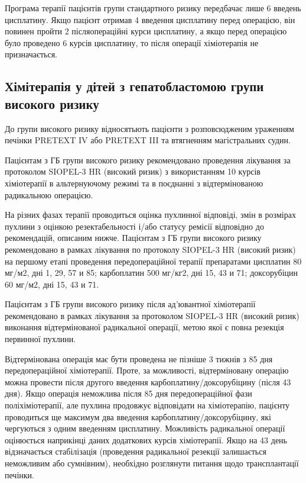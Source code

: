Програма терапії пацієнтів групи стандартного ризику передбачає лише 6 введень цисплатину. Якщо пацієнт отримав 4 введення цисплатину перед операцією, він повинен пройти 2 післяопераційні курси цисплатину, а якщо перед операцією було проведено 6 курсів цисплатину, то після операції хіміотерапія не призначається\cite{pmid32843604}.

\subsection{Хімітерапія у дітей з гепатобластомою групи високого ризику}
До групи високого ризику відносятьють пацієнти з розповсюдженим ураженням печінки PRETEXT IV або PRETEXT III та втягненням магістральних судин.

Пацієнтам з ГБ групи високого ризику рекомендовано проведення лікування за протоколом SIOPEL-3 HR (високий ризик) з використанням 10 курсів хіміотерапії в альтернуючому режимі та в поєднанні з відтермінованою радикальною операцією\cite{pmid28921939}.

На різних фазах терапії проводиться оцінка пухлинної відповіді, змін в розмірах пухлини з оцінкою резектабельності і/або статусу ремісії відповідно до рекомендацій, описаним нижче. 
Пацієнтам з ГБ групи високого ризику рекомендовано в рамках лікування по протоколу SIOPEL-3 HR (високий ризик) на першому етапі проведення передопераційної терапії препаратами цисплатин 80 мг/м2, дні 1, 29, 57 и 85; карбоплатин 500 мг/кг2, дні 15, 43 и 71; доксорубіцин 60 мг/м2, дні 15, 43 и 71.

Пацієнтам з ГБ групи високого ризику після ад'ювантної хіміотерапії рекомендовано в рамках лікування за протоколом SIOPEL-3 HR (високий ризик) виконання відтермінованої радикальної операції, метою якої є повна резекція первинної пухлини\cite{pmid11819207}.

Відтермінована операція має бути проведена не пізніше 3 тижнів з 85 дня передопераційної хіміотерапії. Проте, за можливості, відтерміновану операцію можна провести після другого введення карбоплатину/доксорубіцину (після 43 дня). Якщо операція неможлива після 85 дня передопераційної фази поліхіміотерапії, але пухлина продовжує відповідати на хіміотерапію, пацієнту проводиться ще максимум два введення карбоплатину/доксорубіцину, які чергуються з одним введенням цисплатину. Можливість радикальної операції оцінюється наприкінці даних додаткових курсів хіміотерапії.
Якщо на 43 день відзначається стабілізація (проведення радикальної резекції залишається неможливим або сумнівним), необхідно розглянути питання щодо трансплантації печінки.

